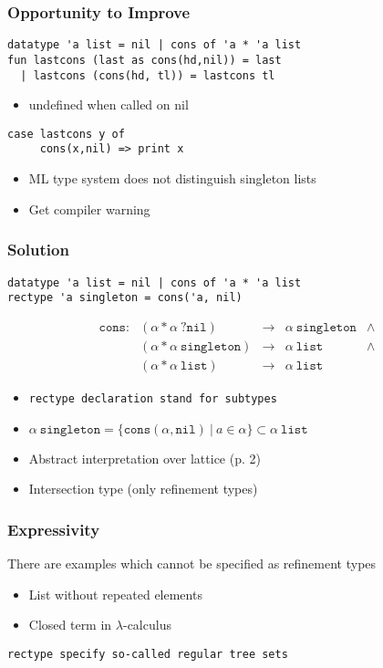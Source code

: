 \documentclass[dvipdfmx,cjk,xcolor=dvipsnames,envcountsect,notheorems,aspectratio=169]{beamer}
\theoremstyle{definition}
\newcommand{\CONS}{\texttt{cons}}
\newcommand{\NIL}{\texttt{nil}}
\newcommand{\SINGLETON}{\texttt{singleton}}
\newcommand{\LIST}{\texttt{list}}
\begin{document}
\begin{frame}[fragile]
	\frametitle{Opportunity to Improve}
\begin{lstlisting}
datatype 'a list = nil | cons of 'a * 'a list
fun lastcons (last as cons(hd,nil)) = last
  | lastcons (cons(hd, tl)) = lastcons tl
\end{lstlisting}
	\begin{itemize}
		\item undefined when called on nil
	\end{itemize}
\begin{lstlisting}
case lastcons y of
     cons(x,nil) => print x
\end{lstlisting}
	\begin{itemize}
		\item ML type system does not distinguish singleton lists
		\item Get compiler warning
	\end{itemize}
\end{frame}

\begin{frame}[fragile]
	\frametitle{Solution}
\begin{lstlisting}
datatype 'a list = nil | cons of 'a * 'a list
rectype 'a singleton = cons('a, nil)
\end{lstlisting}
	\[
		\begin{array}{rlclc}
			\CONS : &(\alpha * \alpha~?\NIL) & \to & \alpha~\SINGLETON & \land \\
							&(\alpha * \alpha~\SINGLETON) & \to & \alpha~\LIST & \land \\
							&(\alpha * \alpha~\LIST) & \to & \alpha~\LIST &
		\end{array}
	\]
	\begin{itemize}
		\item \tt{rectype} declaration stand for subtypes
		\item $\alpha~\SINGLETON=\{\CONS(\alpha, \NIL)~|~a\in \alpha\}\subset \alpha~\LIST$
		\item Abstract interpretation over lattice (p. 2)
		\item Intersection type (only refinement types)
	\end{itemize}
\end{frame}

\begin{frame}
	\frametitle{Expressivity}
	\Large There are examples which cannot be specified as refinement types
	\begin{itemize}
		\item List without repeated elements
		\item Closed term in $\lambda$-calculus
	\end{itemize}
	\tt{rectype} specify so-called regular tree sets
\end{frame}
\end{document}
